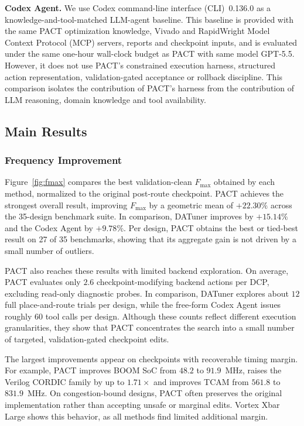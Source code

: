 \documentclass[conference]{IEEEtran}
\begin{document}
\textbf{Codex Agent.}
We use Codex command-line interface (CLI)~0.136.0 as a
knowledge-and-tool-matched LLM-agent baseline. This baseline is
provided with the same PACT optimization knowledge, Vivado and
 RapidWright Model Context Protocol (MCP) servers, reports and checkpoint inputs,
and is evaluated
under the same one-hour wall-clock budget as PACT with same model GPT-5.5.
However, it does not use PACT's constrained execution
harness, structured action representation, validation-gated
acceptance or rollback discipline. This comparison
isolates the
contribution of PACT's harness from the contribution of LLM reasoning,
domain knowledge and tool availability.

\subsection{Main Results}
\label{sec:main-results}


\subsubsection{Frequency Improvement}
\label{sec:frequency-improvement}

Figure~\ref{fig:fmax} compares the best validation-clean $F_{\max}$ obtained by each method, normalized to the original post-route checkpoint. PACT achieves the strongest overall result, improving $F_{\max}$ by a geometric mean of $\mathbf{+22.30\%}$ across the 35-design benchmark suite. In comparison, DATuner improves by $\mathbf{+15.14\%}$ and the Codex Agent by $\mathbf{+9.78\%}$. Per design, PACT obtains the best or tied-best result on 27 of 35 benchmarks, showing that its aggregate gain is not driven by a small number of outliers.

PACT also reaches these results with limited backend exploration. On
average, PACT evaluates only $2.6$ checkpoint-modifying backend actions
per DCP, excluding read-only diagnostic probes. In comparison, DATuner
explores about $12$ full place-and-route trials per design, while the
free-form Codex Agent issues roughly $60$ tool calls per design. Although
these counts reflect different execution granularities, they show that
PACT concentrates the search into a small number of targeted,
validation-gated checkpoint edits.

The largest improvements appear on checkpoints with recoverable timing margin. For example, PACT improves BOOM SoC from $48.2$ to $91.9$~MHz, raises the Verilog CORDIC family by up to $1.71\times$ and improves TCAM from $561.8$ to $831.9$~MHz. On congestion-bound designs, PACT often preserves the original implementation rather than accepting unsafe or marginal edits. Vortex Xbar Large shows this behavior, as all methods find limited additional margin.
\end{document}
